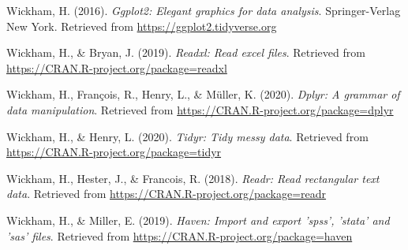 \documentclass[english,man,floatsintext]{apa6}
\begin{document}
\leavevmode\hypertarget{ref-R-ggplot2}{}%
Wickham, H. (2016). \emph{Ggplot2: Elegant graphics for data analysis}. Springer-Verlag New York. Retrieved from \url{https://ggplot2.tidyverse.org}

\leavevmode\hypertarget{ref-R-readxl}{}%
Wickham, H., \& Bryan, J. (2019). \emph{Readxl: Read excel files}. Retrieved from \url{https://CRAN.R-project.org/package=readxl}

\leavevmode\hypertarget{ref-R-dplyr}{}%
Wickham, H., François, R., Henry, L., \& Müller, K. (2020). \emph{Dplyr: A grammar of data manipulation}. Retrieved from \url{https://CRAN.R-project.org/package=dplyr}

\leavevmode\hypertarget{ref-R-tidyr}{}%
Wickham, H., \& Henry, L. (2020). \emph{Tidyr: Tidy messy data}. Retrieved from \url{https://CRAN.R-project.org/package=tidyr}

\leavevmode\hypertarget{ref-R-readr}{}%
Wickham, H., Hester, J., \& Francois, R. (2018). \emph{Readr: Read rectangular text data}. Retrieved from \url{https://CRAN.R-project.org/package=readr}

\leavevmode\hypertarget{ref-R-haven}{}%
Wickham, H., \& Miller, E. (2019). \emph{Haven: Import and export 'spss', 'stata' and 'sas' files}. Retrieved from \url{https://CRAN.R-project.org/package=haven}

\endgroup
\end{document}
